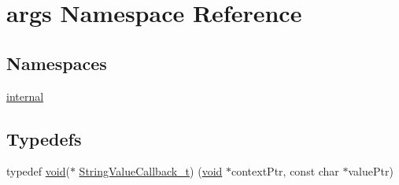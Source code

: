 \hypertarget{namespaceargs}{}\section{args Namespace Reference}
\label{namespaceargs}
\subsection*{Namespaces}
\begin{DoxyCompactItemize}
\item 
 \hyperlink{namespaceargs_1_1internal}{internal}
\end{DoxyCompactItemize}
\subsection*{Typedefs}
\begin{DoxyCompactItemize}
\item 
typedef \hyperlink{_t_e_m_p_l_a_t_e__cdef_8h_ac9c84fa68bbad002983e35ce3663c686}{void}($\ast$ \hyperlink{namespaceargs_a80ec8961b6c497068858afd698ac71cb}{String\+Value\+Callback\+\_\+t}) (\hyperlink{_t_e_m_p_l_a_t_e__cdef_8h_ac9c84fa68bbad002983e35ce3663c686}{void} $\ast$context\+Ptr, const char $\ast$value\+Ptr)
\end{DoxyCompactItemize}
